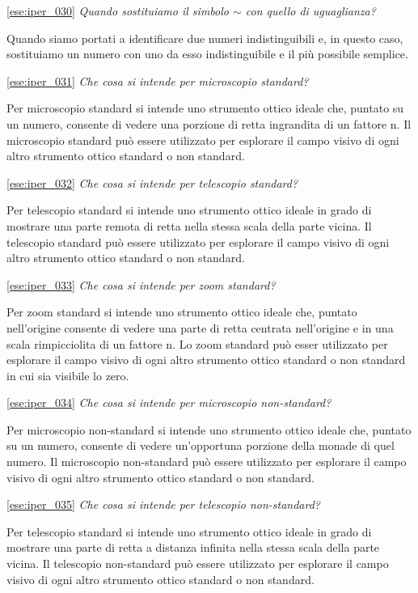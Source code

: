 \ref{ese:iper_030} 
\emph{Quando sostituiamo il simbolo \(\sim\) con quello di uguaglianza?}

Quando siamo portati a identificare due numeri indistinguibili e, in questo 
caso, sostituiamo un numero con uno da esso indistinguibile e il più possibile 
semplice.

\ref{ese:iper_031} 
\emph{Che cosa si intende per microscopio standard?}

Per microscopio standard si intende uno strumento ottico ideale che, puntato su 
un numero, consente di vedere una porzione di retta ingrandita di un fattore n. 
Il microscopio standard può essere utilizzato per esplorare il campo visivo 
di ogni altro strumento ottico standard o non standard.

\ref{ese:iper_032} 
\emph{Che cosa si intende per telescopio standard?}

Per telescopio standard si intende uno strumento ottico ideale in grado di 
mostrare una parte remota di retta nella stessa scala della parte vicina. Il 
telescopio standard può essere utilizzato per esplorare il campo visivo di ogni 
altro strumento ottico standard o non standard.

\ref{ese:iper_033} 
\emph{Che cosa si intende per zoom standard?}

Per zoom standard si intende uno strumento ottico ideale che, puntato 
nell'origine consente di vedere una parte di retta centrata nell'origine e in 
una scala rimpicciolita di un fattore n. Lo zoom standard può esser utilizzato 
per esplorare il campo visivo di ogni altro strumento ottico standard o non 
standard in cui sia visibile lo zero.

\ref{ese:iper_034} 
\emph{Che cosa si intende per microscopio non-standard?}

Per microscopio non-standard si intende uno strumento ottico ideale che, 
puntato su un numero, consente di vedere un'opportuna porzione della monade di 
quel numero. Il microscopio non-standard può essere utilizzato per esplorare il 
campo visivo di ogni altro strumento ottico standard o non standard.

\ref{ese:iper_035} 
\emph{Che cosa si intende per telescopio non-standard?}

Per telescopio standard si intende uno strumento ottico ideale in grado di 
mostrare una parte di retta a distanza infinita nella stessa scala della parte 
vicina. Il telescopio non-standard può essere utilizzato per esplorare il 
campo visivo di ogni altro strumento ottico standard o non standard.

